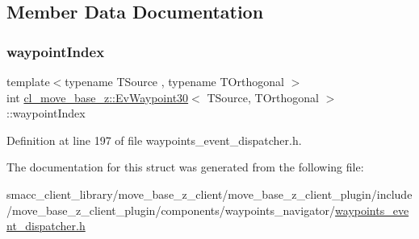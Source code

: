 \subsection{Member Data Documentation}
\mbox{\label{structcl__move__base__z_1_1EvWaypoint30_aaa90bce1d5c685e8caa4aa09bfef9ef5}} 
\subsubsection{\texorpdfstring{waypoint\+Index}{waypointIndex}}
{\footnotesize\ttfamily template$<$typename T\+Source , typename T\+Orthogonal $>$ \\
int \hyperlink{structcl__move__base__z_1_1EvWaypoint30}{cl\+\_\+move\+\_\+base\+\_\+z\+::\+Ev\+Waypoint30}$<$ T\+Source, T\+Orthogonal $>$\+::waypoint\+Index}



Definition at line 197 of file waypoints\+\_\+event\+\_\+dispatcher.\+h.



The documentation for this struct was generated from the following file\+:\begin{DoxyCompactItemize}
\item 
smacc\+\_\+client\+\_\+library/move\+\_\+base\+\_\+z\+\_\+client/move\+\_\+base\+\_\+z\+\_\+client\+\_\+plugin/include/move\+\_\+base\+\_\+z\+\_\+client\+\_\+plugin/components/waypoints\+\_\+navigator/\hyperlink{waypoints__event__dispatcher_8h}{waypoints\+\_\+event\+\_\+dispatcher.\+h}\end{DoxyCompactItemize}
